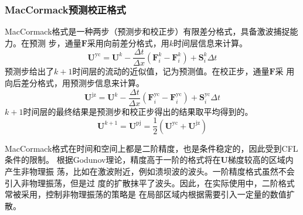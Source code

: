 \subsubsection{MacCormack预测校正格式}
MacCormack格式是一种两步（预测步和校正步）有限差分格式，具备激波捕捉能力。在预测
步，通量$\mathbf{F}$采用向前差分格式，用$k$时间层信息来计算。
\begin{equation}
  \mathbf{U}^{\mathrm{yc}} =
  \mathbf{U}^{k} -
  \frac{\Delta t }{\Delta x }
  (\mathbf{F}_{i}^{k} - \mathbf{F}_{i}^{k}) +
  \mathbf{S}_{i}^{k}\Delta t
\end{equation}
预测步给出了$k+1$时间层的流动的近似值，记为预测值。在校正步，通量$\mathbf{F}$采
用向后差分格式，用预测步信息来计算。
\begin{equation}
  \mathbf{U}^{\mathrm{jz}} =
  \mathbf{U}^{k} -
  \frac{\Delta t }{\Delta x }
  (\mathbf{F}_{i}^{\mathrm{yc}} - \mathbf{F}_{i}^{\mathrm{yc}}) +
  \mathbf{S}_{i}^{\mathrm{yc}}\Delta t
\end{equation}
$k+1$时间层的最终结果是预测步和校正步得出的结果取平均得到的。
\begin{equation}
  \mathbf{U}^{k+1} =
  \mathbf{U}^{\mathrm{pj}} =
  \frac{1}{2}
  (\mathbf{U}^{\mathrm{yc}} +\mathbf{U}^{\mathrm{jz}})
\end{equation}

MacCormack格式在时间和空间上都是二阶精度，也是条件稳定的，因此受到CFL条件的限制。
根据Godunov理论，精度高于一阶的格式将在$\mathbf{U}$梯度较高的区域内产生非物理振
荡，比如在激波附近，例如溃坝波的波头。一阶精度格式虽然不会引入非物理振荡，但是过
度的扩散抹平了波头。因此，在实际使用中，二阶格式常被采用，控制非物理振荡的策略是
在局部区域内根据需要引入一定量的数值扩散。

